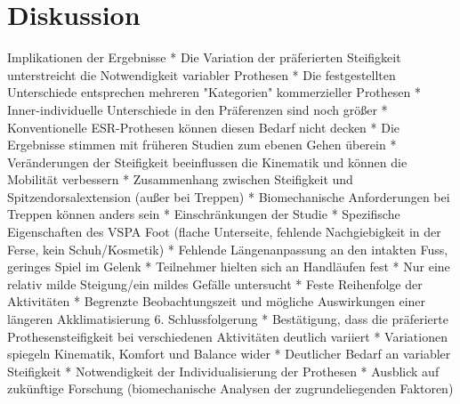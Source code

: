 \section{Diskussion}
Implikationen der Ergebnisse *   Die Variation der präferierten Steifigkeit unterstreicht die Notwendigkeit variabler Prothesen *   Die festgestellten Unterschiede entsprechen mehreren "Kategorien" kommerzieller Prothesen *   Inner-individuelle Unterschiede in den Präferenzen sind noch größer *   Konventionelle ESR-Prothesen können diesen Bedarf nicht decken *   Die Ergebnisse stimmen mit früheren Studien zum ebenen Gehen überein *   Veränderungen der Steifigkeit beeinflussen die Kinematik und können die Mobilität verbessern *   Zusammenhang zwischen Steifigkeit und Spitzendorsalextension (außer bei Treppen) *   Biomechanische Anforderungen bei Treppen können anders sein *   Einschränkungen der Studie *   Spezifische Eigenschaften des VSPA Foot (flache Unterseite, fehlende Nachgiebigkeit in der Ferse, kein Schuh/Kosmetik) *   Fehlende Längenanpassung an den intakten Fuss, geringes Spiel im Gelenk *   Teilnehmer hielten sich an Handläufen fest *   Nur eine relativ milde Steigung/ein mildes Gefälle untersucht *   Feste Reihenfolge der Aktivitäten *   Begrenzte Beobachtungszeit und mögliche Auswirkungen einer längeren Akklimatisierung
6. Schlussfolgerung *   Bestätigung, dass die präferierte Prothesensteifigkeit bei verschiedenen Aktivitäten deutlich variiert *   Variationen spiegeln Kinematik, Komfort und Balance wider *   Deutlicher Bedarf an variabler Steifigkeit *   Notwendigkeit der Individualisierung der Prothesen *   Ausblick auf zukünftige Forschung (biomechanische Analysen der zugrundeliegenden Faktoren)

